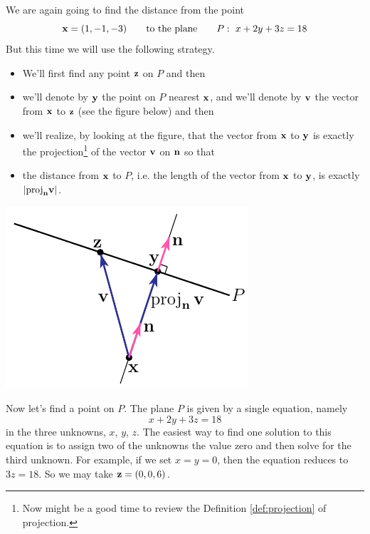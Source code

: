 \begin{eg}
                                \label{eg:VPdistance-point-plane-bis}
We are again going to find the distance from the point 
\begin{equation*}
\mathbf{x} = (1,-1,-3) \qquad\text{to the plane}\qquad
P:\ x+2y+3z=18
\end{equation*}
But this time we will use the following strategy.
\begin{itemize}
\item We'll first find any point $\mathbf{z}$ on $P$ and then

\item we'll denote by $\mathbf{y}$ the point on $P$ nearest $\mathbf{x}$, and we'll 
   denote by $\mathbf{v}$ the vector from $\mathbf{x}$ to $\mathbf{z}$ (see the figure below)
   and then

\item we'll realize, by looking at the figure, that the vector from $\mathbf{x}$ 
to $\mathbf{y}$ is exactly the projection\footnote{Now might be a good time to review 
the Definition \ref{def:projection} of projection.} of the vector $\mathbf{v}$ on $\mathbf{n}$ so that

\item the distance from $\mathbf{x}$ to $P$, i.e. the length of the vector 
from $\mathbf{x}$ to $\mathbf{y}$, is exactly $\left|\text{proj}_{\mathbf{n}}\mathbf{v} \right|$.
\end{itemize}
\begin{efig}
\begin{center}
   \includegraphics{pointDistProj.pdf}
\end{center}
\end{efig}
Now let's find a point on $P$. The plane $P$ is given by a single equation,
namely 
$$
x+2y+3z=18
$$ 
in the three unknowns, $x$, $y$, $z$. The easiest way
to find one solution to this equation is to assign two of the unknowns
the value zero and then solve for the third unknown. For example, if we
set $x=y=0$, then the equation reduces to $3z=18$. So we may take
$\mathbf{z}=(0,0,6)$.



\end{eg}
